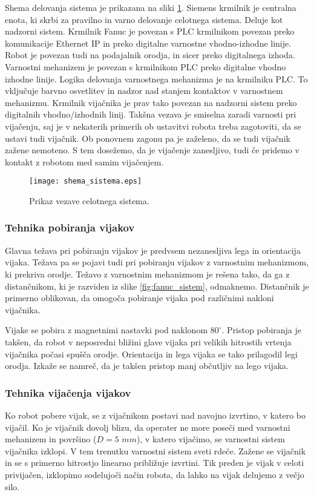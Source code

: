 Shema delovanja sistema je prikazana na sliki \ref{fig:shema_sistema}. Siemens krmilnik je centralna enota, ki skrbi za pravilno in varno delovanje celotnega sistema. Deluje kot nadzorni sistem. Krmilnik Fanuc je povezan s PLC krmilnikom povezan preko komunikacije Ethernet IP in preko digitalne varnostne vhodno-izhodne linije.  Robot je povezan tudi na podajalnik orodja, in sicer preko digitalnega izhoda. Varnostni mehanizem je povezan s krmilnikom PLC preko digitalne vhodno izhodne linije. Logika delovanja varnostnega mehanizma je na krmilniku PLC. To vključuje barvno osvetlitev in nadzor nad stanjem kontaktov v varnostnem mehanizmu.  Krmilnik vijačnika je prav tako povezan na nadzorni sistem preko digitalnih vhodno/izhodnih linij. Takšna vezava je smiselna zaradi varnosti pri vijačenju, saj je v nekaterih primerih ob ustavitvi robota treba zagotoviti, da se ustavi tudi vijačnik. Ob ponovnem zagonu pa je zaželeno, da se tudi vijačnik zažene nemoteno. S tem dosežemo, da je vijačenje zanesljivo, tudi če pridemo v kontakt z robotom med samim vijačenjem.

\begin{figure}[!hbt]
	\centering
	\texttt{[image: shema\_sistema.eps]}
	\caption{Prikaz vezave celotnega sistema.}
	\label{fig:shema_sistema}
\end{figure}

\subsubsection{Tehnika pobiranja vijakov}

Glavna težava pri pobiranju vijakov je predvsem nezanesljiva lega in orientacija vijaka. Težava pa se pojavi tudi pri pobiranju vijakov z varnostnim mehanizmom, ki prekriva orodje. Težavo z varnostnim mehanizmom je rešena tako, da ga z distančnikom, ki je razviden iz slike \ref{fig:fanuc_sistem}, odmaknemo. Distančnik je primerno oblikovan, da omogoča pobiranje vijaka pod različnimi nakloni vijačnika. 

Vijake se pobira z magnetnimi nastavki pod naklonom $80^{\circ}$. Pristop pobiranja je takšen, da robot v neposredni bližini glave vijaka pri velikih hitrostih vrtenja vijačnika počasi spušča orodje. Orientacija in lega vijaka se tako prilagodil legi orodja. Izkaže se namreč, da je takšen pristop manj občutljiv na lego vijaka.   

\subsubsection{Tehnika vijačenja vijakov}
Ko robot pobere vijak, se z vijačnikom postavi nad navojno izvrtino, v katero bo vijačil. Ko je vijačnik dovolj blizu, da operater ne more poseči med varnostni mehanizem in površino ($D = 5$ $mm$), v katero vijačimo, se varnostni sistem vijačnika izklopi. V tem trenutku varnostni sistem sveti rdeče. Zažene se vijačnik in se s primerno hitrostjo linearno približuje izvrtini. Tik preden je vijak v celoti privijačen, izklopimo sodelujoči način robota, da lahko na vijak delujemo z večjo silo. 

